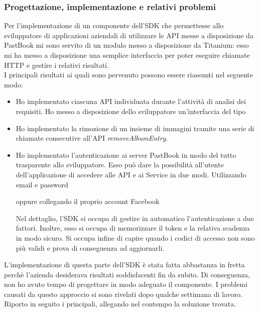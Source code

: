 			\subsubsection{Progettazione, implementazione e relativi problemi}
				Per l'implementazione di un componente dell'SDK che permettesse allo sviluppatore di applicazioni aziendali di
				utilizzare le API messe a disposizione da PastBook mi sono servito di un modulo messo a disposizione da Titanium:
				esso mi ha messo a disposizione una semplice interfaccia per poter eseguire chiamate HTTP e gestire i relativi
				risultati.\\
				I principali risultati ai quali sono pervenuto possono essere riassunti nel seguente modo:
				\begin{itemize}
					\item Ho implementato ciascuna API individuata durante l'attività di analisi dei requisiti. Ho messo a
					disposizione dello sviluppatore un'interfaccia del tipo
					
					\item Ho implementato la rimozione di un insieme di immagini tramite una serie di chiamate consecutive
					all'API \emph{removeAlbumEntry}.
					\item Ho implementato l'autenticazione ai server PastBook in modo del tutto trasparente allo sviluppatore.
					Esso può dare la possibilità all'utente dell'applicazione di accedere alle API e ai Service in due modi.
					Utilizzando email e password
					
					oppure collegando il proprio account Facebook
					
					Nel dettaglio, l'SDK si occupa di gestire in automatico l'autenticazione a due fattori. Inoltre, esso si
					occupa di memorizzare il token e la relativa scadenza in modo sicuro. Si occupa infine di capire quando i
					codici di accesso non sono più validi e prova di conseguenza ad aggiornarli.
				\end{itemize}
				L'implementazione di questa parte dell'SDK è stata fatta abbastanza in fretta perchè l'azienda desiderava risultati
				soddisfacenti fin da subito. Di conseguenza, non ho avuto tempo di progettare in modo adeguato il componente. I
				problemi causati da questo approccio si sono rivelati dopo qualche settimana di lavoro. Riporto in seguito i
				principali, allegando nel contempo la soluzione trovata.
